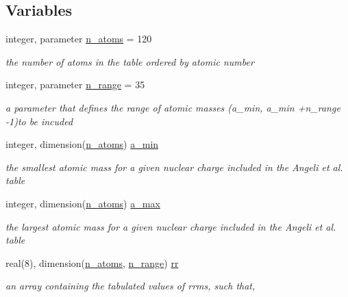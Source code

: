 \subsection*{Variables}
\begin{DoxyCompactItemize}
\item 
integer, parameter \mbox{\hyperlink{namespacenucleus__m_a97ff520812e294bf26a6b2c330f211e5}{n\+\_\+atoms}} = 120
\begin{DoxyCompactList}\small\item\em the number of atoms in the table ordered by atomic number \end{DoxyCompactList}\item 
integer, parameter \mbox{\hyperlink{namespacenucleus__m_adf953c9196f6870fe5e502b4f40bea48}{n\+\_\+range}} = 35
\begin{DoxyCompactList}\small\item\em a parameter that defines the range of atomic masses (a\+\_\+min, a\+\_\+min +n\+\_\+range -\/1)to be incuded \end{DoxyCompactList}\item 
integer, dimension(\mbox{\hyperlink{namespacenucleus__m_a97ff520812e294bf26a6b2c330f211e5}{n\+\_\+atoms}}) \mbox{\hyperlink{namespacenucleus__m_a8541e730d34d4c5cbb0ca885c9c5cc35}{a\+\_\+min}}
\begin{DoxyCompactList}\small\item\em the smallest atomic mass for a given nuclear charge included in the Angeli et al. table \end{DoxyCompactList}\item 
integer, dimension(\mbox{\hyperlink{namespacenucleus__m_a97ff520812e294bf26a6b2c330f211e5}{n\+\_\+atoms}}) \mbox{\hyperlink{namespacenucleus__m_ac8aa001386cf3938a2be5b5ec45d0c8d}{a\+\_\+max}}
\begin{DoxyCompactList}\small\item\em the largest atomic mass for a given nuclear charge included in the Angeli et al. table \end{DoxyCompactList}\item 
real(8), dimension(\mbox{\hyperlink{namespacenucleus__m_a97ff520812e294bf26a6b2c330f211e5}{n\+\_\+atoms}}, \mbox{\hyperlink{namespacenucleus__m_adf953c9196f6870fe5e502b4f40bea48}{n\+\_\+range}}) \mbox{\hyperlink{namespacenucleus__m_aadb2a0e0828722e6e3f118cdf1b07f50}{rr}}
\begin{DoxyCompactList}\small\item\em an array containing the tabulated values of rrms, such that, \end{DoxyCompactList}\end{DoxyCompactItemize}


